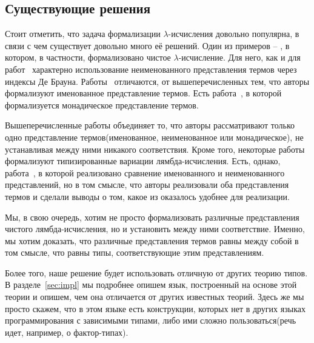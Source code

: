 \subsection{Существующие решения}

Стоит отметить, что задача формализации $\lambda$-исчисления довольно популярна, в связи с чем существует довольно много её решений. Один из примеров -- \cite{lambdaForm}, в котором, в частности, формализовано чистое $\lambda$-исчисление. Для него, как и для работ~\cite{shankar1988mechanical, altenkirch1993formalization, barras1996coq, nipkow1996more, huet1994residual} характерно использование неименованного представления термов через индексы Де Брауна. Работы~\cite{mckinna1999some, coquand1996algorithm, gabbay1999new, gordon1996five, sato1983theory, stoughton1988substitution} отличаются, от вышеперечисленных тем, что авторы формализуют именованное представление термов. Есть работа~\cite{altenkirch1999monadic}, в которой формализуется монадическое представление термов.

Вышеперечисленные работы объединяет то, что авторы рассматривают только одно представление термов(именованное, неименованное или монадическое), не устанавливая между ними никакого соответствия. Кроме того, некоторые работы формализуют типизированные вариации лямбда-исчисления. Есть, однако, работа~\cite{berghofer2007head}, в которой реализовано сравнение именованного и неименованного представлений, но в том смысле, что авторы реализовали оба представления термов и сделали выводы о том, какое из оказалось удобнее для реализации.

Мы, в свою очередь, хотим не просто формализовать различные представления чистого лямбда-исчисления, но и установить между ними соответствие. Именно, мы хотим доказать, что различные представления термов равны между собой в том смысле, что равны типы, соответствующие этим представлениям.

Более того, наше решение будет использовать отличную от других теорию типов. В разделе~\ref{sec:impl} мы подробнее опишем язык, построенный на основе этой теории и опишем, чем она отличается от других известных теорий. Здесь же мы просто скажем, что в этом языке есть конструкции, которых нет в других языках программирования с зависимыми типами, либо ими сложно пользоваться(речь идет, например, о фактор-типах).
